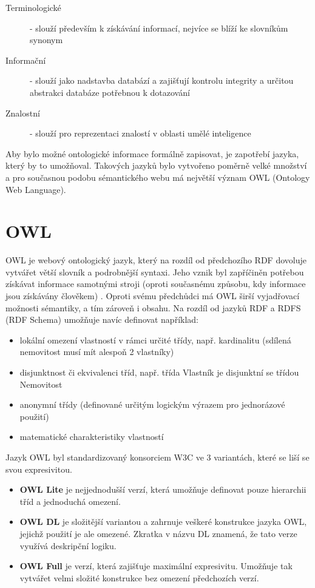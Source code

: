 \documentclass{projekt}
\begin{document}
\begin{description}
\item[Terminologické] - slouží především k získávání informací, nejvíce se blíží ke slovníkům synonym

\item[Informační] - slouží jako nadstavba databází a zajišťují kontrolu integrity a určitou abstrakci databáze potřebnou k dotazování

\item[Znalostní] - slouží pro reprezentaci znalostí v oblasti umělé inteligence 
\end{description}

Aby bylo možné ontologické informace formálně zapisovat, je zapotřebí jazyka, který by to umožňoval. Takových jazyků bylo vytvořeno poměrně velké množství a pro současnou podobu sémantického webu má největší význam OWL (Ontology Web Language).

\section{OWL}
\hspace{0.65cm}OWL je webový ontologický jazyk, který na rozdíl od předchozího RDF dovoluje vytvářet větší slovník a podrobnější syntaxi. Jeho vznik byl zapříčiněn potřebou získávat informace samotnými stroji (oproti současnému způsobu, kdy informace jsou získávány člověkem) \cite{sest}.
Oproti svému předchůdci má OWL širší vyjadřovací možnosti sémantiky, a tím zároveň i obsahu. 
Na rozdíl od jazyků RDF a RDFS (RDF Schema) umožňuje navíc definovat například:

\begin{itemize}
\item lokální omezení vlastností v rámci určité třídy, např. kardinalitu (sdílená nemovitost musí mít alespoň 2 vlastníky)
\item disjunktnost či ekvivalenci tříd, např. třída Vlastník je disjunktní se třídou Nemovitost
\item anonymní třídy (definované určitým logickým výrazem pro jednorázové použití)
\item matematické charakteristiky vlastností \cite{pet}
\end{itemize}

Jazyk OWL byl standardizovaný konsorciem W3C ve 3 variantách, které se liší se svou expresivitou.


\begin{itemize}
\item {\bf OWL Lite} je nejjednodušší verzí, která umožňuje definovat pouze hierarchii tříd a jednoduchá omezení.

\item {\bf OWL DL} je složitější variantou a zahrnuje veškeré konstrukce jazyka OWL, jejichž použití je ale omezené. Zkratka v názvu DL znamená, že tato verze využívá deskripční logiku.

\item {\bf OWL Full} je verzí, která zajišťuje maximální expresivitu. Umožňuje tak vytvářet velmi 
   složité konstrukce bez omezení předchozích verzí. 

\end{itemize}
\end{document}
